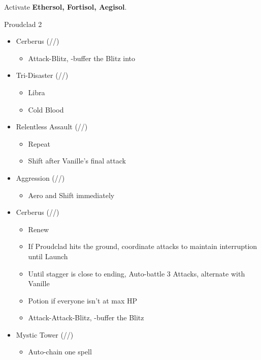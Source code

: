 Activate \textbf{Ethersol, Fortisol, Aegisol}.
\renewcommand{\first}{[1] Aggression (\rav/\com/\com)}
\renewcommand{\second}{[2] Cerberus (\com/\com/\com)}
\renewcommand{\third}{[3] Mystic Tower (\rav/\sen/\rav)}
\renewcommand{\fourth}{[4] Solidarity (\com/\sen/\med)}
\renewcommand{\fifth}{[5] Relentless Assault (\rav/\com/\rav)}
\renewcommand{\sixth}{[6] Tri-Disaster (\rav/\rav/\rav)}
\begin{battle}{Proudclad 2}
\begin{multicols}{2}
\begin{itemize}
    \item \second
    \begin{itemize}
        \item Attack-Blitz, \rav-buffer the Blitz into
    \end{itemize}
    \item \sixth
    \begin{itemize}
        \item Libra
        \item Cold Blood
    \end{itemize}
    \item \fifth
    \begin{itemize}
        \item Repeat
        \item Shift after Vanille's final attack
    \end{itemize}
    \item \first
    \begin{itemize}
        \item Aero and Shift immediately
    \end{itemize}
    \item \second
    \begin{itemize}
        \item Renew
        \item If Proudclad hits the ground, coordinate attacks to maintain interruption until Launch
        \item Until stagger is close to ending, Auto-battle 3 Attacks, alternate with Vanille
        \item Potion if everyone isn't at max HP
        \item Attack-Attack-Blitz, \rav-buffer the Blitz
    \end{itemize}
    \item \third
    \begin{itemize}
        \item Auto-chain one spell

\end{itemize}
\end{itemize}
\end{multicols}
\end{battle}
